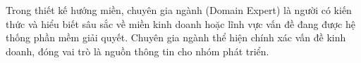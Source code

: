
Trong thiết kế hướng miền, chuyên gia ngành (Domain Expert) là người có kiến thức và hiểu biết sâu sắc về miền kinh doanh hoặc lĩnh vực vấn đề đang được hệ thống phần mềm giải quyết. Chuyên gia ngành thể hiện chính xác vấn đề kinh doanh, đóng vai trò là nguồn thông tin cho nhóm phát triển.

